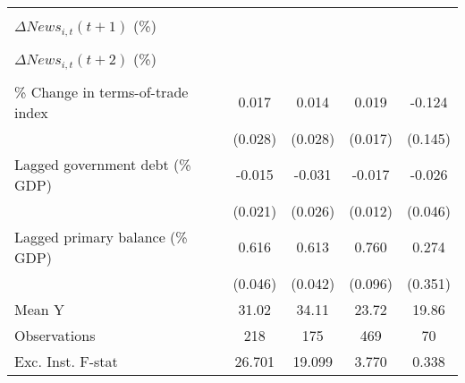 {\begin{tabular}{l*{4}{c}}
                    &                     &                     &                     &                     \\
\addlinespace
$ \Delta News_{i,t}(t+1)$ (\%)&                     &                     &                     &                     \\
                    &                     &                     &                     &                     \\
\addlinespace
$ \Delta News_{i,t}(t+2)$ (\%)&                     &                     &                     &                     \\
                    &                     &                     &                     &                     \\
\addlinespace
\% Change in terms-of-trade index&       0.017         &       0.014         &       0.019         &      -0.124         \\
                    &     (0.028)         &     (0.028)         &     (0.017)         &     (0.145)         \\
\addlinespace
Lagged government debt (\% GDP)&      -0.015         &      -0.031         &      -0.017         &      -0.026         \\
                    &     (0.021)         &     (0.026)         &     (0.012)         &     (0.046)         \\
\addlinespace
Lagged primary balance (\% GDP)&       0.616\sym{***}&       0.613\sym{***}&       0.760\sym{***}&       0.274         \\
                    &     (0.046)         &     (0.042)         &     (0.096)         &     (0.351)         \\
\midrule
Mean Y              &       31.02         &       34.11         &       23.72         &       19.86         \\
Observations        &         218         &         175         &         469         &          70         \\
Exc. Inst. F-stat   &      26.701         &      19.099         &       3.770         &       0.338         \\
\bottomrule
\end{tabular}
}
